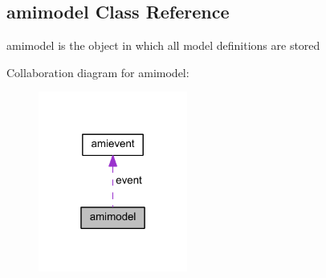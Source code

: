 \hypertarget{classamimodel}{}\subsection{amimodel Class Reference}
\label{classamimodel}


amimodel is the object in which all model definitions are stored  




Collaboration diagram for amimodel\+:\nopagebreak
\begin{figure}[H]
\begin{center}
\leavevmode
\includegraphics[width=139pt]{classamimodel__coll__graph}
\end{center}
\end{figure}
